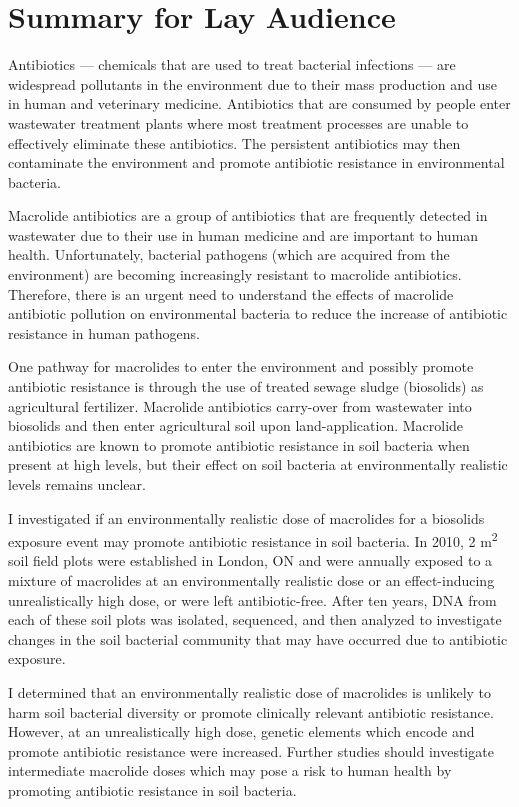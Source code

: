 \chapter*{Summary for Lay Audience}

Antibiotics --- chemicals that are used to treat bacterial infections --- are widespread pollutants in the environment due to their mass production and use in human and veterinary medicine.
Antibiotics that are consumed by people enter wastewater treatment plants where most treatment processes are unable to effectively eliminate these antibiotics.
The persistent antibiotics may then contaminate the environment and promote antibiotic resistance in environmental bacteria.

Macrolide antibiotics are a group of antibiotics that are frequently detected in wastewater due to their use in human medicine and are important to human health.
Unfortunately, bacterial pathogens (which are acquired from the environment) are becoming increasingly resistant to macrolide antibiotics.
Therefore, there is an urgent need to understand the effects of macrolide antibiotic pollution on environmental bacteria to reduce the increase of antibiotic resistance in human pathogens.

One pathway for macrolides to enter the environment and possibly promote antibiotic resistance is through the use of treated sewage sludge (biosolids) as agricultural fertilizer.
Macrolide antibiotics carry-over from wastewater into biosolids and then enter agricultural soil upon land-application.
Macrolide antibiotics are known to promote antibiotic resistance in soil bacteria when present at high levels, but their effect on soil bacteria at environmentally realistic levels remains unclear.

I investigated if an environmentally realistic dose of macrolides for a biosolids exposure event may promote antibiotic resistance in soil bacteria.
In 2010, 2 m\textsuperscript{2} soil field plots were established in London, ON and were annually exposed to a mixture of macrolides at an environmentally realistic dose or an effect-inducing unrealistically high dose, or were left antibiotic-free.
After ten years, DNA from each of these soil plots was isolated, sequenced, and then analyzed to investigate changes in the soil bacterial community that may have occurred due to antibiotic exposure.

I determined that an environmentally realistic dose of macrolides is unlikely to harm soil bacterial diversity or promote clinically relevant antibiotic resistance.
However, at an unrealistically high dose, genetic elements which encode and promote antibiotic resistance were increased.
Further studies should investigate intermediate macrolide doses which may pose a risk to human health by promoting antibiotic resistance in soil bacteria.
